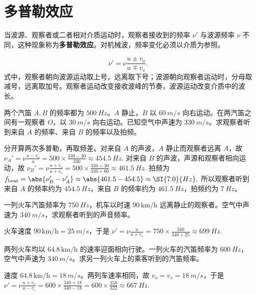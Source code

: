 
\section{多普勒效应}

\begin{definition}[多普勒效应]
当波源、观察者或二者相对介质运动时，观察者接收到的频率 \(\nu'\) 与波源频率 \(\nu\) 不同，这种现象称为\textbf{多普勒效应}。对机械波，频率变化必须以介质为参照。

\[
\nu'=\nu\frac{u\pm v_o}{u\mp v_s}.
\]
式中，观察者朝向波源运动取上号，远离取下号；波源朝向观察者运动时，分母取减号，远离取加号。观察者运动改变接收波峰的节奏，波源运动改变介质中的波长。
\end{definition}

\begin{exercise}[两个汽笛同时发声时怎样判出拍频]
两个汽笛 \(A,B\) 的频率都为 \(\SI{500}{Hz}\)。\(A\) 静止，\(B\) 以 \(\SI{60}{m/s}\) 向右运动。在两汽笛之间有一观察者 \(O\)，以 \(\SI{30}{m/s}\) 向右运动。已知空气中声速为 \(\SI{330}{m/s}\)。求观察者听到来自 \(A\) 的频率、来自 \(B\) 的频率以及拍频。
\end{exercise}

\begin{solution}
分开算两次多普勒，再取频差。对来自 \(A\) 的声波，\(A\) 静止而观察者远离 \(A\)，故
 \(\nu_A'=\nu\frac{u-v_o}{u} =500\times\frac{330-30}{330} \approx \SI{454.5}{Hz}.\) 
对来自 \(B\) 的声波，声源和观察者相向运动，故
 \(\nu_B'=\nu\frac{u+v_o}{u+v_s} =500\times\frac{330+30}{330+60} \approx \SI{461.5}{Hz}.\) 
拍频为
 \(f_{\text{beat}}=\abs{\nu_B'-\nu_A'} \approx \abs{461.5-454.5} \approx \SI{7.0}{Hz}.\) 
所以观察者听到来自 \(A\) 的频率约为 \(\SI{454.5}{Hz}\)，来自 \(B\) 的频率约为 \(\SI{461.5}{Hz}\)，拍频约为 \(\SI{7}{Hz}\)。
\end{solution}

\begin{exercise}
一列火车汽笛频率为 \(\SI{750}{Hz}\)，机车以时速 \(90\,\mathrm{km/h}\) 远离静止的观察者。空气中声速为 \(\SI{340}{m/s}\)，求观察者听到的声音频率。
\end{exercise}

\begin{solution}
火车速度 \(90\,\mathrm{km/h}=\SI{25}{m/s}\)，于是
 \(\nu'=\nu\frac{u}{u+v_s} =750\times\frac{340}{340+25} \approx \SI{699}{Hz}.\) 
\end{solution}

\begin{exercise}[2015-2016期末：两列相向火车中的汽笛频率]
两列火车均以 \(64.8\,\mathrm{km/h}\) 的速率迎面相向行驶。一列火车的汽笛频率为 \(\SI{600}{Hz}\)，空气中声速为 \(\SI{340}{m/s}\)。求另一列火车上的乘客听到的汽笛频率。
\end{exercise}

\begin{solution}
速度 \(64.8\,\mathrm{km/h}=\SI{18}{m/s}\)。两列车速率相同，故 \(v_o=v_s=\SI{18}{m/s}\)，于是
 \(\nu'=\nu\frac{u+v_o}{u-v_s} =600\times\frac{340+18}{340-18} =600\times\frac{358}{322} \approx\SI{667}{Hz}.\) 
\end{solution}
